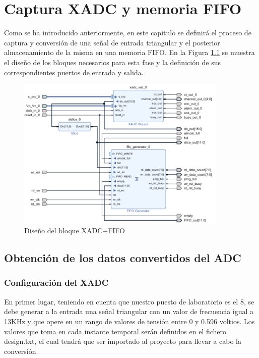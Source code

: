 \chapter{Captura XADC y memoria FIFO}
\label{section:xadc_fifo}


Como se ha introducido anteriormente, en este capítulo se definirá el proceso de captura y conversión de una señal de entrada triangular y el posterior almacenamiento de la misma en una memoria FIFO. En la Figura \ref{fig:xadc_fifo} se muestra el diseño de los bloques necesarios para esta fase y la definición de sus correspondientes puertos de entrada y salida.

\vspace{3mm}

\begin{figure}[h]
    \centering
    \includegraphics[width=0.9\textwidth]{img/diseno/xadc_fifo.PNG}
    \caption{Diseño del bloque XADC+FIFO}
    \label{fig:xadc_fifo}
\end{figure}
    
\vspace{3mm}

\section{Obtención de los datos convertidos del ADC}

\subsection{Configuración del XADC}

En primer lugar, teniendo en cuenta que nuestro puesto de laboratorio es el 8, se debe generar a la entrada una señal triangular con un valor de frecuencia igual a 13KHz y que opere en un rango de valores de tensión entre 0 y 0.596 voltios. Los valores que toma en cada instante temporal serán definidos en el fichero design.txt, el cual tendrá que ser importado al proyecto para llevar a cabo la conversión.

